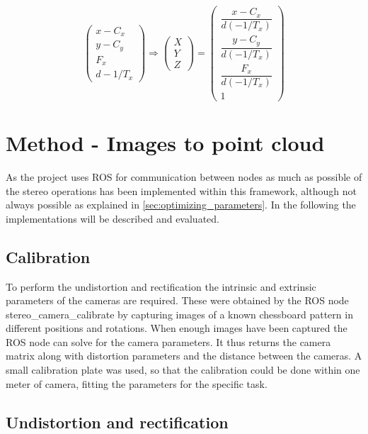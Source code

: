 \[
 \begin{pmatrix}
  x - C_{x} \\
  y - C_{y} \\
  F_{x} \\
  d-1/T_{x} 
 \end{pmatrix}
 \Rightarrow
  \begin{pmatrix}  
  X\\
  Y\\
  Z
 \end{pmatrix}
 =
 \begin{pmatrix}
  \dfrac{x - C_{x}}{ d(-1/T_{x})}  \\
  \dfrac{y - C_{y} }{ d(-1/T_{x})}\\
  \dfrac{F_{x}}{ d(-1/T_{x})}\\
  1
 \end{pmatrix}
\]

\section{Method - Images to point cloud}

As the project uses ROS for communication between nodes as much as possible of the stereo operations has been implemented within this framework, although not always possible as explained in \ref{sec:optimizing_parameters}. In the following the implementations will be described and evaluated.

\subsection{Calibration} \label{sec:calibration}

To perform the undistortion and rectification the intrinsic and extrinsic parameters of the cameras are required. These were obtained by the ROS node stereo\_camera\_calibrate by capturing images of a known chessboard pattern in different positions and rotations. When enough images have been captured the ROS node can solve for the camera parameters. It thus returns the camera matrix along with distortion parameters and the distance between the cameras. A small calibration plate was used, so that the calibration could be done within one meter of camera, fitting the parameters for the specific task.

\subsection{Undistortion and rectification}

